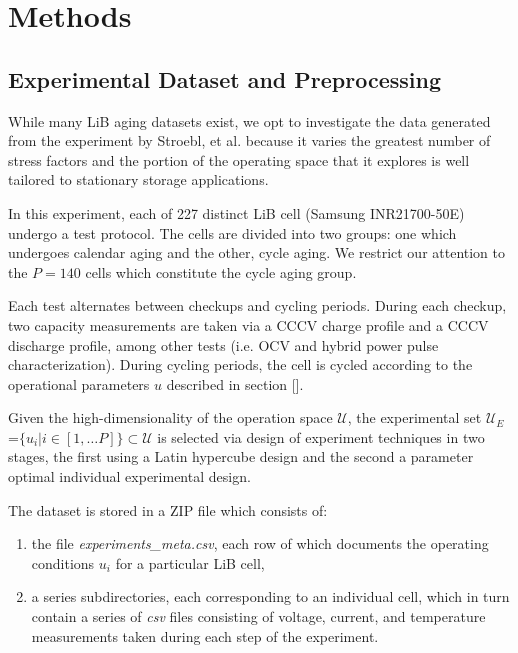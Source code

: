 \documentclass[conference]{IEEEtran}
\begin{document}
\section{Methods}

\subsection{Experimental Dataset and Preprocessing}
\label{sec:dataset-proc}

While many LiB aging datasets exist, we opt to investigate
the data generated from the experiment by Stroebl, et
al.\cite{stroebl_multi-stage_2024} because
it varies the greatest number of stress factors and the portion of the
operating space that it explores is well tailored to stationary storage
applications. 

In this experiment, each of 227 distinct LiB cell (Samsung INR21700-50E)
undergo a test protocol. The cells are divided into two groups:
one which undergoes calendar aging and the other, cycle aging.
We restrict our attention to the $P=140$ cells which constitute the cycle
aging group.

Each test alternates between checkups and cycling periods.
During each checkup, two capacity measurements are taken via a
CCCV charge profile and a CCCV discharge profile, among other tests
(i.e. OCV and hybrid power pulse characterization). 
During cycling periods, the cell is cycled according to the operational
parameters $u$ described in section [].

Given the high-dimensionality of the operation space $\mathcal{U}$,
the experimental set $\mathcal{U}_E$ =$\{u_i | i \in [1, \dots P]\} \subset \mathcal{U}$
is selected via design of experiment techniques in two stages,
the first using a Latin hypercube design and the second a parameter optimal
individual experimental design.

The dataset is stored in a ZIP file which consists of:
\begin{enumerate}
    \item the file {\it experiments\_meta.csv},
    each row of which documents the operating conditions $u_i$ for a particular
    LiB cell,
    \item a series subdirectories, each corresponding to an individual cell,
    which in turn contain a series of {\it csv} files 
    consisting of voltage, current, and temperature measurements
    taken during each step of the experiment.
\end{enumerate}
\end{document}
